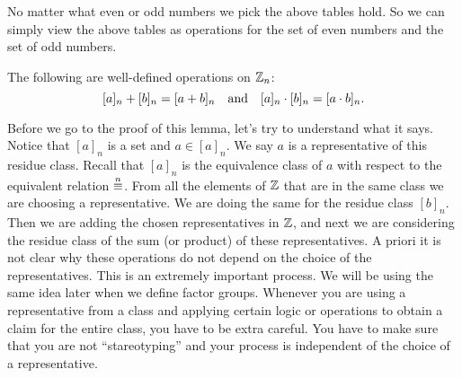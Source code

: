 No matter what even or odd numbers we pick the above
tables hold. So we can simply view the above tables as
operations for the set of even numbers and the set of odd numbers.

\begin{lemma}
    The following are well-defined operations on $\mathbb{Z}_n$:
    \[[a]_n+[b]_n=[a+b]_n\text{\quad and\quad}[a]_n\cdot [b]_n=[a\cdot b]_n.\]
\end{lemma}

Before we go to the proof of this lemma, let's try to understand 
what it says. Notice that $[a]_n$ is a set and $a\in[a]_n$.
We say $a$ is a representative of this residue class.
Recall that $[a]_n$ is the equivalence class of $a$
with respect to the equivalent relation $\overset{n}{\equiv}$.
From all the elements of $\mathbb{Z}$ that are in the same class
we are choosing a representative. We are doing the same for
the residue class $[b]_n$. Then we are adding the chosen representatives
in $\mathbb{Z}$, and next we are considering the residue class of the
sum (or product) of these representatives.
A priori it is not clear why these operations do not depend
on the choice of the representatives. This is an extremely
important process. We will be using the same idea later when we define
factor groups. Whenever you are using a representative from a 
class and applying certain logic or operations to obtain
a claim for the entire class, you have to be extra careful.
You have to make sure that you are not ``stareotyping'' and
your process is independent of the choice of a representative.

